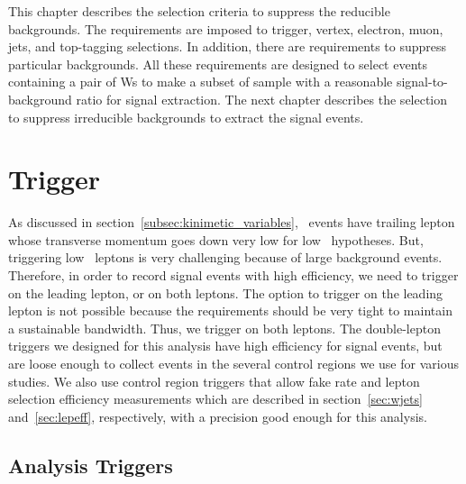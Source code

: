 This chapter describes the selection criteria to suppress the
reducible backgrounds. The requirements are imposed to 
trigger, vertex, electron, muon, jets, and top-tagging selections. 
In addition, there are requirements to suppress 
particular backgrounds. All these requirements are designed 
to select events containing a pair of Ws to make a subset of 
sample with a reasonable signal-to-background ratio for 
signal extraction. The next chapter describes the selection 
to suppress irreducible backgrounds to extract the signal events. 


\section{Trigger}
\label{sec:trigger}

As discussed in section~\ref{subsec:kinimetic_variables}, 
\hww\ events have trailing lepton 
whose transverse momentum goes down very low for low \mHi\ hypotheses. 
But, triggering low 
\pt\ leptons is very challenging because of large background events. 
Therefore, in order to record signal events with high efficiency, 
we need to trigger on the leading lepton, 
or on both leptons. The option to trigger on the leading lepton 
is not possible because the requirements should be very tight 
to maintain a sustainable bandwidth. Thus, we trigger on both leptons. 
The double-lepton triggers we designed for this analysis have high efficiency for  
signal events, but are loose enough to collect events in the several control regions 
we use for various studies. We also use control region triggers that allow 
fake rate and lepton selection efficiency measurements which are described 
in section~\ref{sec:wjets} and~\ref{sec:lepeff}, respectively,
with a precision good enough for this analysis. 


\subsection{Analysis Triggers}

